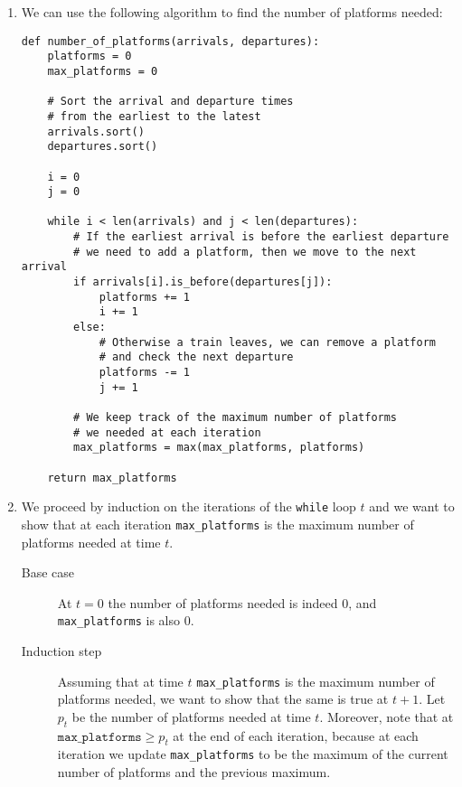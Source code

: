 \documentclass[10pt]{article}
\begin{document}
\begin{enumerate}
    \item We can use the following algorithm to find the number of platforms needed:

          \begin{verbatim}
def number_of_platforms(arrivals, departures):
    platforms = 0
    max_platforms = 0

    # Sort the arrival and departure times
    # from the earliest to the latest
    arrivals.sort()
    departures.sort()

    i = 0
    j = 0

    while i < len(arrivals) and j < len(departures):
        # If the earliest arrival is before the earliest departure
        # we need to add a platform, then we move to the next arrival
        if arrivals[i].is_before(departures[j]): 
            platforms += 1
            i += 1
        else:
            # Otherwise a train leaves, we can remove a platform
            # and check the next departure
            platforms -= 1
            j += 1

        # We keep track of the maximum number of platforms
        # we needed at each iteration
        max_platforms = max(max_platforms, platforms)
    
    return max_platforms
        \end{verbatim}

    \item
          We proceed by induction on the iterations of the \texttt{while} loop $t$ and we want to show that at each iteration \texttt{max\_platforms} is the maximum number of platforms needed at time $t$.

          \begin{description}
              \item[Base case] At $t = 0$ the number of platforms needed is indeed 0, and \texttt{max\_platforms} is also 0.
              \item[Induction step] Assuming that at time $t$ \texttt{max\_platforms} is the maximum number of platforms needed, we want to show that the same is true at $t + 1$.
                  Let $p_t$ be the number of platforms needed at time $t$.
                  Moreover, note that at $\texttt{max\_platforms} \geq p_t$ at the end of each iteration, because at each iteration we update \texttt{max\_platforms} to be the maximum of the current number of platforms and the previous maximum.


\end{description}
\end{enumerate}
\end{document}
